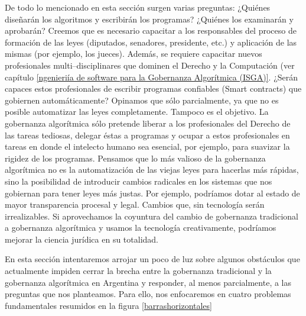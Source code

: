 \documentclass[12pt]{report} %
\begin{document}
De todo lo mencionado en esta sección surgen varias preguntas: ¿Quiénes diseñarán los algoritmos y escribirán los programas? ¿Quiénes los examinarán y aprobarán? Creemos que es necesario capacitar a los responsables del proceso de formación de las leyes (diputados, senadores, presidente, etc.) y aplicación de las mismas (por ejemplo, los jueces). Además, se requiere capacitar nuevos profesionales multi–disciplinares que dominen el Derecho y la Computación (ver capítulo \ref{ngenieriía de software para la Gobernanza Algorítmica (ISGA)}. ¿Serán capaces estos profesionales de escribir programas confiables (Smart contracts) que gobiernen automáticamente? Opinamos que sólo parcialmente, ya que no es posible automatizar las leyes completamente. Tampoco es el objetivo. La gobernanza algorítmica sólo pretende liberar a los profesionales del Derecho de las tareas tediosas, delegar éstas a programas y ocupar a estos profesionales en tareas en donde el intelecto humano sea esencial, por ejemplo, para suavizar la rigidez de los programas. Pensamos que lo más valioso de la gobernanza algorítmica no es la automatización de las viejas leyes para hacerlas más rápidas, sino la posibilidad de introducir cambios radicales en los sistemas que nos gobiernan para tener leyes más justas. Por ejemplo, podríamos dotar al estado de mayor transparencia procesal y legal. Cambios que, sin tecnología serán irrealizables. Si aprovechamos la coyuntura del cambio de gobernanza tradicional a gobernanza algorítmica y usamos la tecnología creativamente, podríamos mejorar la ciencia jurídica en su totalidad. 

En esta sección intentaremos arrojar un poco de luz sobre algunos obstáculos que actualmente impiden cerrar la brecha entre la gobernanza tradicional y la gobernanza algorítmica en Argentina y responder, al menos parcialmente, a las preguntas que nos planteamos. Para ello, nos enfocaremos en cuatro problemas fundamentales resumidos en la figura \ref{barrashorizontales}
\end{document}
